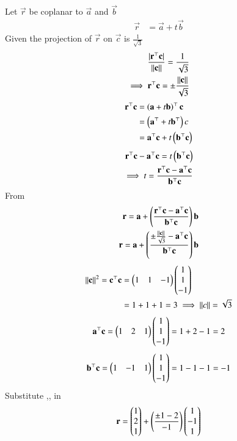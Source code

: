 \documentclass[journal]{IEEEtran}
\begin{document}
Let $\vec{r}$ be coplanar to $\vec{a}$ and $\vec{b}$
\begin{align}
 \vec{r}&=\vec{a}+t\vec{b} 
 \end{align}
Given the projection of $\vec{r}$ on $\vec{c}$ is $\frac{1}{\sqrt{3}}$
\begin{align}
\frac{|\mathbf{r}^\top\mathbf{c}|}{\left\lVert\mathbf{c}\right\rVert} = \frac{1}{\sqrt{3}} \\
\implies \mathbf{r}^\top\mathbf{c}=\pm\frac{\left\lVert\mathbf{c}\right\rVert}{\sqrt{3}}
\end{align}
\begin{align}
\mathbf{r}^\top\mathbf{c}&=\left(\mathbf{a}+t\mathbf{b}\right)^\top\mathbf{c}\\
&=\left(\mathbf{a}^\top+t\mathbf{b}^\top\right)c \\
&=\mathbf{a}^\top\mathbf{c}+t\left(\mathbf{b}^\top\mathbf{c}\right) 
\end{align}
\begin{align}
\mathbf{r}^\top\mathbf{c}-\mathbf{a}^\top\mathbf{c}=t\left(\mathbf{b}^\top\mathbf{c}\right)  \\
\implies t=\frac{\mathbf{r}^\top\mathbf{c}-\mathbf{a}^\top\mathbf{c}}{\mathbf{b}^\top\mathbf{c}}
\end{align}
From 
\begin{align}
    \mathbf{r}=\mathbf{a}+\left(\frac{\mathbf{r}^\top\mathbf{c}-\mathbf{a}^\top\mathbf{c}}{\mathbf{b}^\top\mathbf{c}}\right)\mathbf{b} \\
    \mathbf{r}=\mathbf{a}+\left(\frac{\pm\frac{\left\lVert\mathbf{c}\right\rVert}{\sqrt{3}}-\mathbf{a}^\top\mathbf{c}}{\mathbf{b}^\top\mathbf{c}}\right)\mathbf{b}
\end{align}
\begin{align}
\left\lVert\mathbf{c}\right\rVert^2=\mathbf{c}^\top\mathbf{c}&=\begin{pmatrix}1&1&-1\end{pmatrix}\begin{pmatrix}1\\1\\-1\end{pmatrix} \\
&=1+1+1=3  \implies \left\lVert c\right\rVert=\sqrt{3}
\end{align}  
\begin{align}
\mathbf{a}^\top\mathbf{c}=\begin{pmatrix}1&2&1\end{pmatrix}\begin{pmatrix}1\\1\\-1\end{pmatrix}=1+2-1=2 
\end{align}
\begin{align}
\mathbf{b}^\top\mathbf{c}=\begin{pmatrix}1&-1&1\end{pmatrix}\begin{pmatrix}1\\1\\-1\end{pmatrix}=1-1-1=-1 \\
\end{align}
Substitute ,, in  \\
\begin{align}
\mathbf{r}=\begin{pmatrix}1\\2\\1\end{pmatrix}+\left(\frac{\pm1-2}{-1}\right)\begin{pmatrix}1\\-1\\1\end{pmatrix} 
\end{align}
\end{document}
